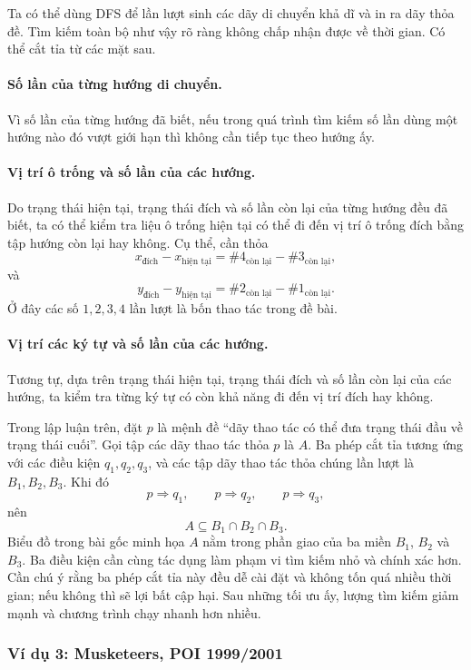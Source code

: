 \documentclass[11pt]{article}
\begin{document}
Ta có thể dùng DFS để lần lượt sinh các dãy di chuyển khả dĩ và in ra dãy
thỏa đề. Tìm kiếm toàn bộ như vậy rõ ràng không chấp nhận được về thời gian.
Có thể cắt tỉa từ các mặt sau.

\paragraph{Số lần của từng hướng di chuyển.}
Vì số lần của từng hướng đã biết, nếu trong quá trình tìm kiếm số lần dùng
một hướng nào đó vượt giới hạn thì không cần tiếp tục theo hướng ấy.

\paragraph{Vị trí ô trống và số lần của các hướng.}
Do trạng thái hiện tại, trạng thái đích và số lần còn lại của từng hướng đều
đã biết, ta có thể kiểm tra liệu ô trống hiện tại có thể đi đến vị trí ô trống
đích bằng tập hướng còn lại hay không. Cụ thể, cần thỏa
\[
  x_{\text{đích}}-x_{\text{hiện tại}}
  = \#4_{\text{còn lại}}-\#3_{\text{còn lại}},
\]
và
\[
  y_{\text{đích}}-y_{\text{hiện tại}}
  = \#2_{\text{còn lại}}-\#1_{\text{còn lại}}.
\]
Ở đây các số $1,2,3,4$ lần lượt là bốn thao tác trong đề bài.

\paragraph{Vị trí các ký tự và số lần của các hướng.}
Tương tự, dựa trên trạng thái hiện tại, trạng thái đích và số lần còn lại của
các hướng, ta kiểm tra từng ký tự có còn khả năng đi đến vị trí đích hay
không.

Trong lập luận trên, đặt $p$ là mệnh đề ``dãy thao tác có thể đưa trạng thái
đầu về trạng thái cuối''. Gọi tập các dãy thao tác thỏa $p$ là $A$. Ba phép
cắt tỉa tương ứng với các điều kiện $q_1,q_2,q_3$, và các tập dãy thao tác
thỏa chúng lần lượt là $B_1,B_2,B_3$. Khi đó
\[
  p\Rightarrow q_1,\qquad p\Rightarrow q_2,\qquad p\Rightarrow q_3,
\]
nên
\[
  A\subseteq B_1\cap B_2\cap B_3.
\]
Biểu đồ trong bài gốc minh họa $A$ nằm trong phần giao của ba miền $B_1$,
$B_2$ và $B_3$. Ba điều kiện cần cùng tác dụng làm phạm vi tìm kiếm nhỏ và
chính xác hơn. Cần chú ý rằng ba phép cắt tỉa này đều dễ cài đặt và không tốn
quá nhiều thời gian; nếu không thì sẽ lợi bất cập hại. Sau những tối ưu ấy,
lượng tìm kiếm giảm mạnh và chương trình chạy nhanh hơn nhiều.

\subsubsection*{Ví dụ 3: Musketeers, POI 1999/2001}
\end{document}

